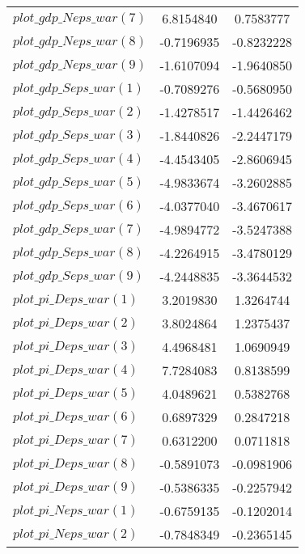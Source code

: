 \begin{center}
\begin{longtable}{lcc}
$plot\_gdp\_N eps\_war (7)  $	 & 	      6.8154840	 & 	      0.7583777 \\ 
$plot\_gdp\_N eps\_war (8)  $	 & 	     -0.7196935	 & 	     -0.8232228 \\ 
$plot\_gdp\_N eps\_war (9)  $	 & 	     -1.6107094	 & 	     -1.9640850 \\ 
$plot\_gdp\_S eps\_war (1)  $	 & 	     -0.7089276	 & 	     -0.5680950 \\ 
$plot\_gdp\_S eps\_war (2)  $	 & 	     -1.4278517	 & 	     -1.4426462 \\ 
$plot\_gdp\_S eps\_war (3)  $	 & 	     -1.8440826	 & 	     -2.2447179 \\ 
$plot\_gdp\_S eps\_war (4)  $	 & 	     -4.4543405	 & 	     -2.8606945 \\ 
$plot\_gdp\_S eps\_war (5)  $	 & 	     -4.9833674	 & 	     -3.2602885 \\ 
$plot\_gdp\_S eps\_war (6)  $	 & 	     -4.0377040	 & 	     -3.4670617 \\ 
$plot\_gdp\_S eps\_war (7)  $	 & 	     -4.9894772	 & 	     -3.5247388 \\ 
$plot\_gdp\_S eps\_war (8)  $	 & 	     -4.2264915	 & 	     -3.4780129 \\ 
$plot\_gdp\_S eps\_war (9)  $	 & 	     -4.2448835	 & 	     -3.3644532 \\ 
$plot\_pi\_D eps\_war (1)   $	 & 	      3.2019830	 & 	      1.3264744 \\ 
$plot\_pi\_D eps\_war (2)   $	 & 	      3.8024864	 & 	      1.2375437 \\ 
$plot\_pi\_D eps\_war (3)   $	 & 	      4.4968481	 & 	      1.0690949 \\ 
$plot\_pi\_D eps\_war (4)   $	 & 	      7.7284083	 & 	      0.8138599 \\ 
$plot\_pi\_D eps\_war (5)   $	 & 	      4.0489621	 & 	      0.5382768 \\ 
$plot\_pi\_D eps\_war (6)   $	 & 	      0.6897329	 & 	      0.2847218 \\ 
$plot\_pi\_D eps\_war (7)   $	 & 	      0.6312200	 & 	      0.0711818 \\ 
$plot\_pi\_D eps\_war (8)   $	 & 	     -0.5891073	 & 	     -0.0981906 \\ 
$plot\_pi\_D eps\_war (9)   $	 & 	     -0.5386335	 & 	     -0.2257942 \\ 
$plot\_pi\_N eps\_war (1)   $	 & 	     -0.6759135	 & 	     -0.1202014 \\ 
$plot\_pi\_N eps\_war (2)   $	 & 	     -0.7848349	 & 	     -0.2365145 \\ 

\end{longtable}
\end{center}
